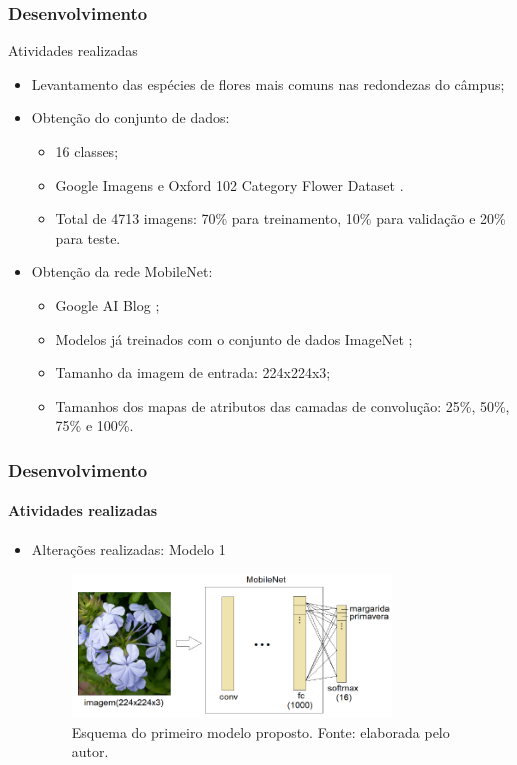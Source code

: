 \documentclass{beamer}
\begin{document}
    
    \begin{frame}[t]
      \frametitle{Desenvolvimento}
      Atividades realizadas      
      \begin{itemize}
        \item<1-> Levantamento das espécies de flores mais comuns nas redondezas do câmpus;\medskip
	    \item<2-> Obtenção do conjunto de dados:
	    		\begin{itemize}
	    			\item<3-> 16 classes;
	    			\item<4-> Google Imagens e Oxford 102 Category Flower Dataset \cite{oxford}.
	    			\item<5-> Total de 4713 imagens: 70\% para treinamento, 10\% para validação e 20\% para teste. \medskip
	    		\end{itemize}
        \item<6-> Obtenção da rede MobileNet: 
        		\begin{itemize}
	    			\item<7-> Google AI Blog \cite{googleaiblog};
	    			\item<7-> Modelos já treinados com o conjunto de dados ImageNet \cite{imagenet}; 
				\item<8-> Tamanho da imagem de entrada: 224x224x3;
				\item<8-> Tamanhos dos mapas de atributos das camadas de convolução: 25\%, 50\%, 75\% e 100\%.\medskip    		
	    		\end{itemize}     
      \end{itemize}
    \end{frame}
    
     \begin{frame}[t]
      \frametitle{Desenvolvimento}
      \framesubtitle{Atividades realizadas}      
      \begin{itemize}
        \item<1-> Alterações realizadas: Modelo 1
        		 \begin{figure}[hbt]
      		 	\begin{center}
      				\includegraphics[width=0.8\textwidth]{img/model1.png}
      			\end{center}
      			\caption{Esquema do primeiro modelo proposto. Fonte: elaborada pelo autor.}
      		\end{figure}
      \end{itemize}
    \end{frame}
    
\end{document}
